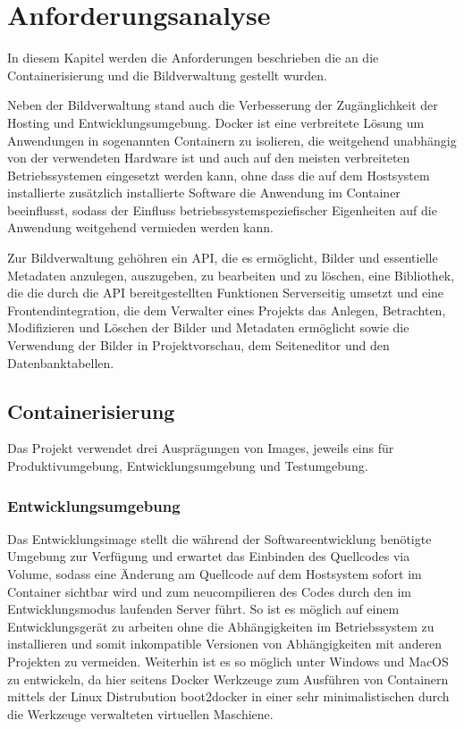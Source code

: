 \section{Anforderungsanalyse}
\label{sec:requirements}

In diesem Kapitel werden die Anforderungen beschrieben die an die
Containerisierung und die Bildverwaltung gestellt wurden.

Neben der Bildverwaltung stand auch die Verbesserung der Zugänglichkeit der
Hosting und Entwicklungsumgebung. Docker ist eine verbreitete Lösung um
Anwendungen in sogenannten Containern zu isolieren, die weitgehend
unabhängig von der verwendeten Hardware ist und auch auf den meisten
verbreiteten Betriebssystemen eingesetzt werden kann, ohne dass die auf dem
Hostsystem installierte zusätzlich installierte Software die Anwendung im
Container beeinflusst, sodass der Einfluss betriebssystemspeziefischer
Eigenheiten auf die Anwendung weitgehend vermieden werden kann.

Zur Bildverwaltung gehöhren ein API, die es ermöglicht, Bilder und
essentielle Metadaten anzulegen, auszugeben, zu bearbeiten und zu löschen,
eine Bibliothek, die die durch die API bereitgestellten Funktionen Serverseitig
umsetzt und eine Frontendintegration, die dem Verwalter eines Projekts das
Anlegen, Betrachten, Modifizieren und Löschen der Bilder und Metadaten
ermöglicht sowie die Verwendung der Bilder in Projektvorschau, dem
Seiteneditor und den Datenbanktabellen.

\subsection{Containerisierung}

Das Projekt verwendet drei Ausprägungen von Images, jeweils eins für
Produktivumgebung, Entwicklungsumgebung und Testumgebung. 

\subsubsection{Entwicklungsumgebung}

Das Entwicklungsimage stellt die während der Softwareentwicklung
benötigte Umgebung zur Verfügung und erwartet das Einbinden des
Quellcodes via Volume, sodass eine Änderung am Quellcode auf dem Hostsystem
sofort im Container sichtbar wird und zum neucompilieren des Codes durch den im
Entwicklungsmodus laufenden Server führt. So ist es möglich auf einem
Entwicklungsgerät zu arbeiten ohne die Abhängigkeiten im Betriebssystem
zu installieren und somit inkompatible Versionen von Abhängigkeiten mit
anderen Projekten zu vermeiden. Weiterhin ist es so möglich unter Windows
und MacOS zu entwickeln, da hier seitens Docker Werkzeuge zum Ausführen von
Containern mittels der Linux Distrubution boot2docker in einer sehr
minimalistischen durch die Werkzeuge verwalteten virtuellen Maschiene.

